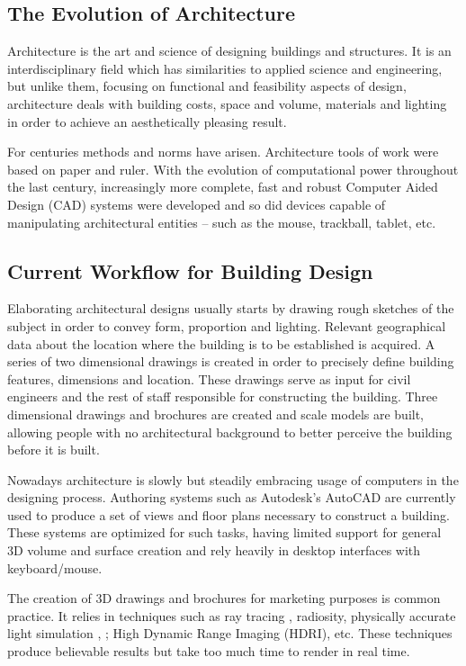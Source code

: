 

\subsection{The Evolution of Architecture}
Architecture is the art and science of designing buildings and structures.
It is an interdisciplinary field which has similarities to applied science and
engineering, but unlike them, focusing on functional and feasibility aspects of design, 
architecture deals with building costs, space and volume, materials and lighting
in order to achieve an aesthetically pleasing result.

For centuries methods and norms have arisen. Architecture tools of work were based on paper and ruler.
With the evolution of computational power throughout the last century, 
increasingly more complete, fast and robust Computer Aided Design (CAD) systems were developed and so did
devices capable of manipulating architectural entities -- such as the mouse, trackball, tablet, etc.

\subsection{Current Workflow for Building Design}
Elaborating architectural designs usually starts by drawing rough sketches of the subject
in order to convey form, proportion and lighting.
Relevant geographical data about the location where the building is to be established is acquired.
A series of two dimensional drawings is created in order to precisely define building features, dimensions and location.
These drawings serve as input for civil engineers and the rest of staff responsible for constructing the building.
Three dimensional drawings and brochures are created and scale models are built,
allowing people with no architectural background to better perceive the building before it is built.

Nowadays architecture is slowly but steadily embracing usage of computers in the designing process.
Authoring systems such as Autodesk's AutoCAD
\cite{SITE-AUTOCAD}
are currently used to produce a set of views and floor plans necessary to construct a building.
These systems are optimized for such tasks, having limited support for general 3D volume and surface creation
and rely heavily in desktop interfaces with keyboard/mouse.

The creation of 3D drawings and brochures for marketing purposes is common practice.
It relies in techniques such as
ray tracing \cite{SITE-POVRAY},
radiosity,
physically accurate light simulation \cite{SITE-MAXWELL}, \cite{SITE-INDIGO}; 
High Dynamic Range Imaging (HDRI), etc.
These techniques produce believable results but take too much time to render in real time.

